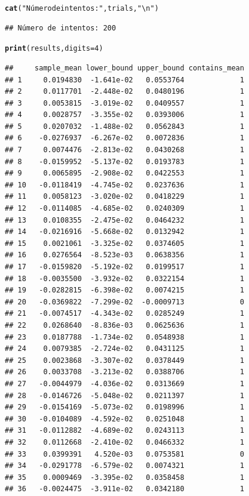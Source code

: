 \documentclass[12pt]{article}\usepackage[]{graphicx}\usepackage[]{xcolor}
\makeatletter
\newcommand{\hlnum}[1]{\textcolor[rgb]{0.686,0.059,0.569}{#1}}%
\newcommand{\hlsng}[1]{\textcolor[rgb]{0.192,0.494,0.8}{#1}}%
\newcommand{\hldef}[1]{\textcolor[rgb]{0.345,0.345,0.345}{#1}}%
\newcommand{\hlkwc}[1]{\textcolor[rgb]{0.333,0.667,0.333}{#1}}%
\newcommand{\hlkwd}[1]{\textcolor[rgb]{0.737,0.353,0.396}{\textbf{#1}}}%
\newenvironment{kframe}{%
 \def\at@end@of@kframe{}%
 \ifinner\ifhmode%
  \def\at@end@of@kframe{\end{minipage}}%
  \begin{minipage}{\columnwidth}%
 \fi\fi%
 \def\FrameCommand##1{\hskip\@totalleftmargin \hskip-\fboxsep
 \colorbox{shadecolor}{##1}\hskip-\fboxsep
     \hskip-\linewidth \hskip-\@totalleftmargin \hskip\columnwidth}%
 \MakeFramed {\advance\hsize-\width
   \@totalleftmargin\z@ \linewidth\hsize
   \@setminipage}}%
 {\par\unskip\endMakeFramed%
 \at@end@of@kframe}
\newenvironment{knitrout}{}{} %
\makeatother
\begin{document}
\begin{knitrout}
\begin{kframe}
\begin{alltt}
\hlkwd{cat}\hldef{(}\hlsng{"Número de intentos:"}\hldef{, trials,} \hlsng{"\textbackslash{}n"}\hldef{)}
\end{alltt}
\begin{verbatim}
## Número de intentos: 200
\end{verbatim}
\begin{alltt}
\hlkwd{print}\hldef{(results,} \hlkwc{digits}\hldef{=} \hlnum{4}\hldef{)}
\end{alltt}
\begin{verbatim}
##     sample_mean lower_bound upper_bound contains_mean
## 1     0.0194830  -1.641e-02   0.0553764             1
## 2     0.0117701  -2.448e-02   0.0480196             1
## 3     0.0053815  -3.019e-02   0.0409557             1
## 4     0.0028757  -3.355e-02   0.0393006             1
## 5     0.0207032  -1.488e-02   0.0562843             1
## 6    -0.0276937  -6.267e-02   0.0072836             1
## 7     0.0074476  -2.813e-02   0.0430268             1
## 8    -0.0159952  -5.137e-02   0.0193783             1
## 9     0.0065895  -2.908e-02   0.0422553             1
## 10   -0.0118419  -4.745e-02   0.0237636             1
## 11    0.0058123  -3.020e-02   0.0418229             1
## 12   -0.0114085  -4.685e-02   0.0240309             1
## 13    0.0108355  -2.475e-02   0.0464232             1
## 14   -0.0216916  -5.668e-02   0.0132942             1
## 15    0.0021061  -3.325e-02   0.0374605             1
## 16    0.0276564  -8.523e-03   0.0638356             1
## 17   -0.0159820  -5.192e-02   0.0199517             1
## 18   -0.0035500  -3.932e-02   0.0322154             1
## 19   -0.0282815  -6.398e-02   0.0074215             1
## 20   -0.0369822  -7.299e-02  -0.0009713             0
## 21   -0.0074517  -4.343e-02   0.0285249             1
## 22    0.0268640  -8.836e-03   0.0625636             1
## 23    0.0187788  -1.734e-02   0.0548938             1
## 24    0.0079385  -2.724e-02   0.0431125             1
## 25    0.0023868  -3.307e-02   0.0378449             1
## 26    0.0033708  -3.213e-02   0.0388706             1
## 27   -0.0044979  -4.036e-02   0.0313669             1
## 28   -0.0146726  -5.048e-02   0.0211397             1
## 29   -0.0154169  -5.073e-02   0.0198996             1
## 30   -0.0104089  -4.592e-02   0.0251048             1
## 31   -0.0112882  -4.689e-02   0.0243113             1
## 32    0.0112668  -2.410e-02   0.0466332             1
## 33    0.0399391   4.520e-03   0.0753581             0
## 34   -0.0291778  -6.579e-02   0.0074321             1
## 35    0.0009469  -3.395e-02   0.0358458             1
## 36   -0.0024475  -3.911e-02   0.0342180             1

\end{verbatim}
\end{kframe}
\end{knitrout}
\end{document}
